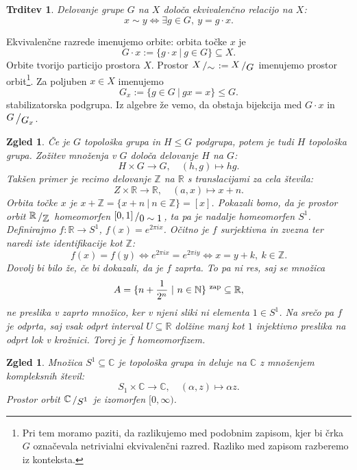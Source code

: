 \documentclass[10pt, a4paper]{article}
\newtheorem{trditev}[izr]{Trditev}
\newtheorem{zgled}[izr]{Zgled}
\newcommand{\N}{\mathbb {N}}
\newcommand{\Z}{\mathbb {Z}}
\newcommand{\R}{\mathbb {R}}
\newcommand{\C}{\mathbb {C}}
\newcommand{\quot}[2]{{\raisebox{0.1em}{$#1$}\left/\raisebox{-0.2em}{$#2$}\right.}}
\begin{document}
\begin{trditev}
  Delovanje grupe $G$ na $X$ določa ekvivalenčno relacijo na $X$:
  $$x \sim y \Leftrightarrow \exists g \in G,\ y = g \cdot x.$$
\end{trditev}
\vspace*{-3mm}
Ekvivalenčne razrede imenujemo orbite: orbita točke $x$ je 
$$G \cdot x := \{g \cdot x\ |\ g \in G\} \subseteq X.$$
Orbite tvorijo particijo prostora $X$. Prostor $\quot{X}{\sim} := \quot{X}{G}$
imenujemo prostor orbit\footnote[1]{Pri tem moramo paziti, da razlikujemo med podobnim zapisom, kjer
bi črka $G$ označevala netrivialni ekvivalenčni razred. Razliko med zapisom razberemo iz konteksta.}.
Za poljuben $x \in X$ imenujemo 
$$G_x := \{ g \in G\ |\ gx = x\} \leq G.$$
stabilizatorska podgrupa. Iz algebre že vemo, da obstaja bijekcija med $G \cdot x$ in $\quot{G}{G_x}$. 

\begin{zgled}
  Če je $G$ topološka grupa in $H \leq G$ podgrupa, potem je tudi $H$ topološka grupa.
  Zožitev množenja v $G$ določa delovanje $H$ na $G$:
  $$H \times G \to G,\quad (h, g) \mapsto hg.$$
  Takšen primer je recimo delovanje $\Z$ na $\R$ s translacijami za cela števila:
  $$Z \times \R \to \R,\quad (a, x) \mapsto x + n.$$
  Orbita točke $x$ je $x + \Z = \{x + n\ |\ n \in \Z\} = [x]$.
  Pokazali bomo, da je prostor orbit $\quot{\R}{\Z}$ homeomorfen $\quot{[0, 1]}{0 \sim 1}$,
  ta pa je nadalje homeomorfen $S^1$.
  \adjustbox{scale=1.5,center}{
    \begin{tikzcd}
        \R \arrow[r, "f"] \arrow[d, "q"] 
          & S^1\\
        \quot{\R}{\Z} \arrow[ur, dashed, "\overline{f}"]
          &  
    \end{tikzcd}
  }
  Definirajmo $f: \R \to S^1$, $f(x) = e^{2\pi i x}$. Očitno je $f$ surjektivna in zvezna
  ter naredi iste identifikacije kot $\Z$:
  $$f(x) = f(y) \Leftrightarrow e^{2 \pi i x} = e^{2 \pi i y} \Leftrightarrow x = y + k,\ k \in \Z.$$
  Dovolj bi bilo že, če bi dokazali, da je $f$ zaprta. To pa ni res, saj se množica 
  $$A = \{n + \frac{1}{2^n}\ |\ n \in \N\}^{\ \textup{zap}} \subseteq \R,$$
  ne preslika v zaprto množico, ker v njeni sliki ni elementa $1 \in S^1$.
  Na srečo pa $f$ je odprta, saj vsak odprt interval $U \subseteq \R$ dolžine manj kot $1$ 
  injektivno preslika na odprt lok v krožnici. Torej je $\overline{f}$ homeomorfizem. 
\end{zgled}

\begin{zgled}
  Množica $S^1 \subseteq \C$ je topološka grupa in deluje na 
  $\C$ z množenjem kompleksnih števil:
  $$S_1 \times \C \to \C,\quad (\alpha, z) \mapsto \alpha z.$$
  Prostor orbit $\quot{\C}{S^1}$ je izomorfen $[0, \infty)$.
\end{zgled}
\end{document}
